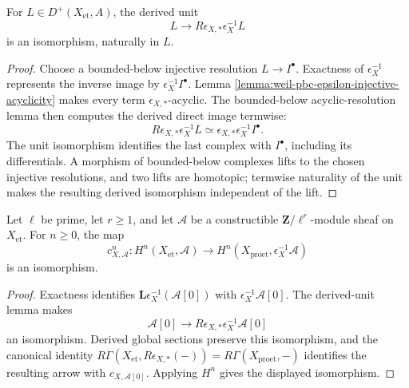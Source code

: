 \begin{lemma}
\label{lemma:weil-pbc-epsilon-derived-unit}
\uses{}

For $L\in D^+(X_{\mathrm{et}},A)$, the derived unit
\[
 L\longrightarrow R\epsilon_{X,*}\epsilon_X^{-1}L
\]
is an isomorphism, naturally in $L$.
\end{lemma}
\begin{proof}

Choose a bounded-below injective resolution $L\to I^\bullet$.  Exactness of
$\epsilon_X^{-1}$ represents the inverse image by
$\epsilon_X^{-1}I^\bullet$.  Lemma
\ref{lemma:weil-pbc-epsilon-injective-acyclicity} makes every term
$\epsilon_{X,*}$-acyclic.  The bounded-below acyclic-resolution lemma then
computes the derived direct image termwise:
\[
 R\epsilon_{X,*}\epsilon_X^{-1}L
 \simeq\epsilon_{X,*}\epsilon_X^{-1}I^\bullet.
\]
The unit isomorphism identifies the last complex with $I^\bullet$, including
its differentials.  A morphism of bounded-below complexes lifts to the chosen
injective resolutions, and two lifts are homotopic; termwise naturality of the
unit makes the resulting derived isomorphism independent of the lift.
\end{proof}


\begin{proposition}
\label{prop:weil-efi-site-derived-comparison-isomorphism}
Let $\ell$ be prime, let $r\geq1$, and let $\mathcal A$ be a constructible
$\mathbf Z/\ell^r$-module sheaf on $X_{\mathrm{et}}$.  For $n\geq0$, the map
\[
 c^n_{X,\mathcal A}:H^n(X_{\mathrm{et}},\mathcal A)
 \longrightarrow
 H^n(X_{\mathrm{proet}},\epsilon_X^{-1}\mathcal A)
\]
is an isomorphism.
\end{proposition}
\begin{proof}
Exactness identifies
$\mathbf L\epsilon_X^{-1}(\mathcal A[0])$ with
$\epsilon_X^{-1}\mathcal A[0]$.  The derived-unit lemma makes
\[
 \mathcal A[0]\longrightarrow
 R\epsilon_{X,*}\epsilon_X^{-1}\mathcal A[0]
\]
an isomorphism.  Derived global sections preserve this isomorphism, and the
canonical identity
$R\Gamma(X_{\mathrm{et}},R\epsilon_{X,*}(-))
=R\Gamma(X_{\mathrm{proet}},-)$ identifies the resulting arrow with
$c_{X,\mathcal A[0]}$.  Applying $H^n$ gives the displayed isomorphism.
\end{proof}

